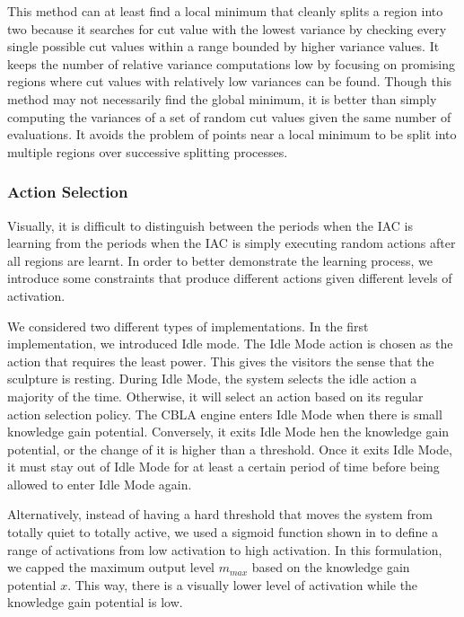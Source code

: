 This method can at least find a local minimum that cleanly splits a region into two because it searches for cut value with the lowest variance by checking every single possible cut values within a range bounded by higher variance values. It keeps the number of relative variance computations low by focusing on promising regions where cut values with relatively low variances can be found. Though this method may not necessarily find the global minimum, it is better than simply computing the variances of a set of random cut values given the same number of evaluations. It avoids the problem of points near a local minimum to be split into multiple regions over successive splitting processes. 

\FloatBarrier 
\subsubsection{Action Selection}\label{sec:action_selection}

Visually, it is difficult to distinguish between the periods when the IAC is learning from the periods when the IAC is simply executing random actions after all regions are learnt. In order to better demonstrate the learning process, we introduce some constraints that produce different actions given different levels of activation. 

We considered two different types of implementations. In the first implementation, we introduced Idle mode. The Idle Mode action is chosen as the action that requires the least power. This gives the visitors the sense that the sculpture is resting. During Idle Mode, the system selects the idle action a majority of the time. Otherwise, it will select an action based on its regular action selection policy. The CBLA engine enters Idle Mode when there is small knowledge gain potential. Conversely, it exits Idle Mode hen the knowledge gain potential, or the change of it is higher than a threshold. Once it exits Idle Mode, it must stay out of Idle Mode for at least a certain period of time before being allowed to enter Idle Mode again. 

Alternatively, instead of having a hard threshold that moves the system from totally quiet to totally active, we used a sigmoid function shown in  to define a range of activations from low activation to high activation. In this formulation, we capped the maximum output level $m_{max}$ based on the knowledge gain potential $x$. This way, there is a visually lower level of activation while the knowledge gain potential is low. 


